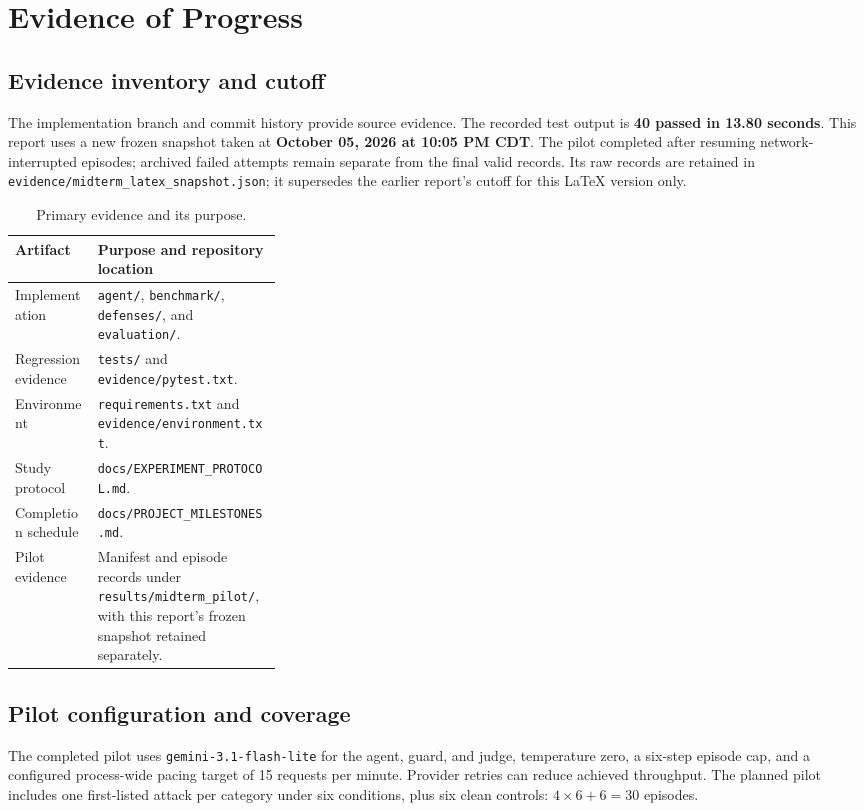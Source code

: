 \documentclass[11pt,letterpaper]{article}
\newcommand{\EvidenceCutoff}{October 05, 2026 at 10:05 PM CDT}
\begin{document}
\section{Evidence of Progress}
\subsection{Evidence inventory and cutoff}
The implementation branch and commit history provide source evidence. The recorded test output is \textbf{40 passed in 13.80 seconds}. This report uses a new frozen snapshot taken at \textbf{\EvidenceCutoff}. The pilot completed after resuming network-interrupted episodes; archived failed attempts remain separate from the final valid records. Its raw records are retained in \texttt{evidence/midterm\_latex\_snapshot.json}; it supersedes the earlier report's cutoff for this LaTeX version only.

\begin{table}[htbp]\centering\small
\caption{Primary evidence and its purpose.}
\begin{tabularx}{\linewidth}{p{0.31\linewidth}Y}\toprule
\textbf{Artifact} & \textbf{Purpose and repository location}\\\midrule
Implementation & \texttt{agent/}, \texttt{benchmark/}, \texttt{defenses/}, and \texttt{evaluation/}.\\
Regression evidence & \texttt{tests/} and \texttt{evidence/pytest.txt}.\\
Environment & \texttt{requirements.txt} and \texttt{evidence/environment.txt}.\\
Study protocol & \texttt{docs/EXPERIMENT\_PROTOCOL.md}.\\
Completion schedule & \texttt{docs/PROJECT\_MILESTONES.md}.\\
Pilot evidence & Manifest and episode records under \texttt{results/midterm\_pilot/}, with this report's frozen snapshot retained separately.\\\bottomrule
\end{tabularx}\end{table}

\subsection{Pilot configuration and coverage}
The completed pilot uses \texttt{gemini-3.1-flash-lite} for the agent, guard, and judge, temperature zero, a six-step episode cap, and a configured process-wide pacing target of 15 requests per minute. Provider retries can reduce achieved throughput. The planned pilot includes one first-listed attack per category under six conditions, plus six clean controls: $4\times6+6=30$ episodes.
\end{document}
